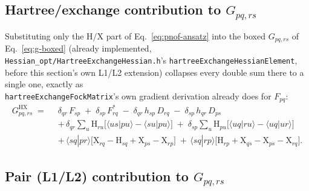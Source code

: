 \documentclass[11pt]{article}
\begin{document}
\subsection*{Hartree/exchange contribution to $G_{pq,rs}$}

Substituting only the $\mathrm{H}/\mathrm{X}$ part of
Eq.~\eqref{eq:pnof-ansatz} into the boxed $G_{pq,rs}$ of
Eq.~\eqref{eq:g-boxed} (already implemented,
\texttt{Hessian\_opt/HartreeExchangeHessian.h}'s \texttt{hartreeExchangeHessianElement},
before this section's own L1/L2 extension) collapses every double sum
there to a single one, exactly as\\ \texttt{hartreeExchangeFockMatrix}'s own
gradient derivation already does for $F_{pq}$:
\begin{equation}
\begin{aligned}
G^{\mathrm{HX}}_{pq,rs} \;=\;\;
& \delta_{qr}\,F_{sp} \;+\; \delta_{sp}\,F^{*}_{rq}
\;-\; \delta_{qr}\,h_{sp}\,D_{rq} \;-\; \delta_{sp}\,h_{qr}\,D_{ps} \\[4pt]
& +\,\delta_{qr}\sum_{u}\mathrm{H}_{ru}\big[\langle us|pu\rangle-\langle su|pu\rangle\big]
\;+\;\delta_{sp}\sum_{u}\mathrm{H}_{pu}\big[\langle uq|ru\rangle-\langle uq|ur\rangle\big] \\[4pt]
& +\,\langle sq|pr\rangle\Big[\mathrm{X}_{rq}-\mathrm{H}_{sq}+\mathrm{X}_{ps}-\mathrm{X}_{rp}\Big]
\;+\,\langle sq|rp\rangle\Big[\mathrm{H}_{rp}+\mathrm{X}_{qs}-\mathrm{X}_{ps}-\mathrm{X}_{rq}\Big].
\end{aligned}
\label{eq:pnof-hx-term}
\end{equation}

\subsection*{Pair (L1/L2) contribution to $G_{pq,rs}$}
\end{document}
